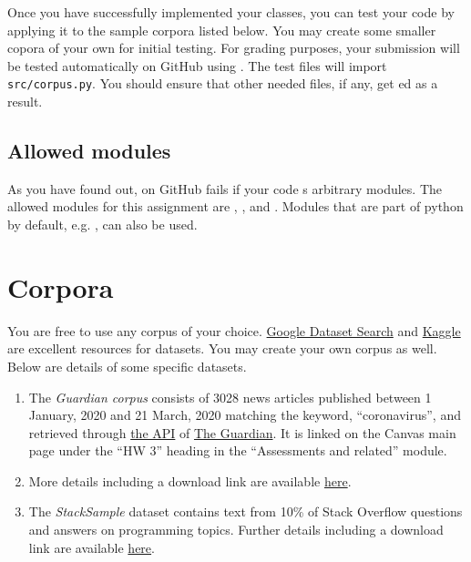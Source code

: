 \documentclass[addpoints]{exam}
\begin{document}
Once you have successfully implemented your classes, you can test your code by applying it to the sample corpora listed below. You may create some smaller copora of your own for initial testing. For grading purposes, your submission will be tested automatically on GitHub using . The test files will import \texttt{src/corpus.py}. You should ensure that other needed files, if any, get ed as a result.

\subsection{Allowed modules}

As you have found out,  on GitHub fails if your code s arbitrary modules. The allowed modules for this assignment are , , and . Modules that are part of python by default, e.g. , can also be used.

\section{Corpora}
\label{sec:corpora}

You are free to use any corpus of your choice. \href{https://datasetsearch.research.google.com}{Google Dataset Search} and \href{https://www.kaggle.com/datasets}{Kaggle} are excellent resources for datasets. You may create your own corpus as well. Below are details of some specific datasets.
\begin{enumerate}
\item The \textit{Guardian corpus} consists of 3028 news articles published between 1 January, 2020 and 21 March, 2020 matching the keyword, ``coronavirus'', and retrieved through \href{https://open-platform.theguardian.com}{the API} of \href{https://www.theguardian.com/}{The Guardian}. It is linked on the Canvas main page under the ``HW 3'' heading in the ``Assessments and related'' module.
\item {} More details including a download link are available \href{http://qwone.com/~jason/20Newsgroups/}{here}.
\item The \textit{StackSample} dataset contains text from 10\% of Stack Overflow questions and answers on programming topics. Further details including a download link are available \href{https://www.kaggle.com/datasets/stackoverflow/stacksample?fbclid=IwAR0kFAaMfLW9DViWaRapXd6xhdGmsnM56hExLL9aVqNfOPBeLvBOxkel85g}{here}.
\end{enumerate}
   
\end{document}
